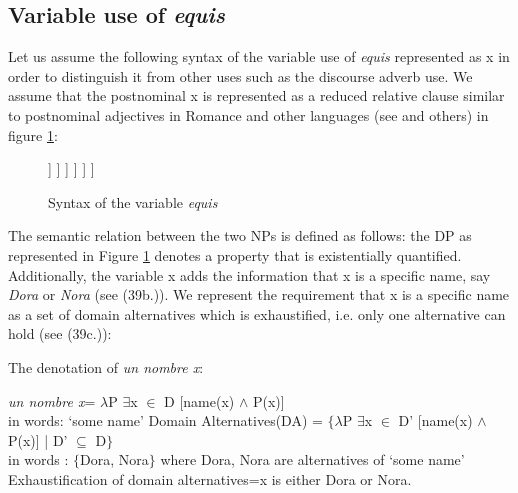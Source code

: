 \documentclass[output=paper]{langsci/langscibook}
\begin{document}
\subsection{Variable use of \textit{equis}}\label{sec:kellert:3.2}
Let us assume the following syntax of the variable use of \textit{equis} represented as x in order to distinguish it from other uses such as the discourse adverb use. We assume that the postnominal x is represented as a reduced relative clause similar to postnominal adjectives in Romance and other languages (see \citealt{Cinque:2010} and others) in figure \ref{fig:kellert:tree1n}:


\begin{figure}
	\begin{forest}
		[DP
			[D\\\textit{un}\\`a'] [NP
				[NP\\\textit{nombre}\\`name'] [CP
					[C\\(\textit{que})\\`that'] [TP
						[T\\(\textit{es})\\`is'] [VP
							[~] [NP [$X$,roof]]
						]
					]
				]
			]
		]
	\end{forest}
	\caption{Syntax of the variable \textit{equis}\label{fig:kellert:tree1n}}

\end{figure}

The semantic relation between the two NPs is defined as follows: the DP as represented in Figure \ref{fig:kellert:tree1n} denotes a property that is existentially quantified. Additionally, the variable x adds the information that x is a specific name, say \textit{Dora} or \textit{Nora} (see (39b.)). We represent the requirement that x is a specific name as a set of domain alternatives which is exhaustified, i.e. only one alternative can hold (see (39c.)):

\ea The denotation of \textit{un nombre x}:
\begin{xlist}
\ex
{\textlbrackdbl \textit{un nombre x}\textrbrackdbl = $\lambda$P $\exists$x $\in$ D [name(x) $\wedge$ P(x)]}\\
in words: ‘some name’
\ex
{Domain Alternatives(DA) = $\lbrace$$\lambda$P $\exists$x $\in$ D’ [name(x) $\wedge$ P(x)] | D’ $\subseteq$ D$\rbrace$}\\
in words : $\lbrace$Dora, Nora$\rbrace$ where Dora, Nora are alternatives of ‘some name’
\ex
Exhaustification of domain alternatives=x is either Dora or Nora.
\end{xlist}
\z
\end{document}
